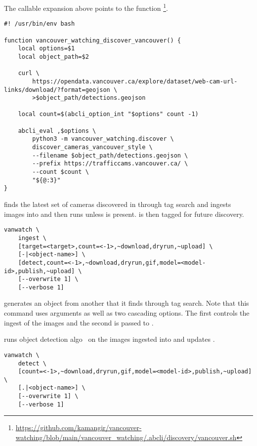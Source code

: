 %
The callable expansion above points to the function \footnote{\url{https://github.com/kamangir/vancouver-watching/blob/main/vancouver_watching/.abcli/discovery/vancouver.sh}}.
%
\begin{graybox}
\begin{verbatim}
#! /usr/bin/env bash

function vancouver_watching_discover_vancouver() {
    local options=$1
    local object_path=$2

    curl \
        https://opendata.vancouver.ca/explore/dataset/web-cam-url-links/download/?format=geojson \
        >$object_path/detections.geojson

    local count=$(abcli_option_int "$options" count -1)

    abcli_eval ,$options \
        python3 -m vancouver_watching.discover \
        discover_cameras_vancouver_style \
        --filename $object_path/detections.geojson \
        --prefix https://trafficcams.vancouver.ca/ \
        --count $count \
        "${@:3}"
}
\end{verbatim}
\end{graybox}

\marginpar{\keyword{ingest}}
 finds the latest set of cameras discovered in  through tag search and ingests  images into  and then runs  unless  is present.  is then tagged for future discovery. 
%
\begin{graybox}
\begin{verbatim}
vanwatch \
    ingest \
    [target=<target>,count=<-1>,~download,dryrun,~upload] \
    [-|<object-name>] \
    [detect,count=<-1>,~download,dryrun,gif,model=<model-id>,publish,~upload] \
    [--overwrite 1] \
    [--verbose 1]
\end{verbatim}
\end{graybox}
%
\keyword{vanwatch ingest} generates an object from another that it finds through tag search. Note that this command uses arguments as well as two cascading options. The first controls the ingest of the images and the second is passed to \keyword{detect}.

 runs object detection algo~\cite{ultralytics} on the images ingested into  and updates .
%
\begin{graybox}
\begin{verbatim}
vanwatch \
    detect \
    [count=<-1>,~download,dryrun,gif,model=<model-id>,publish,~upload] \
    [.|<object-name>] \
    [--overwrite 1] \
    [--verbose 1]
\end{verbatim}
\end{graybox}